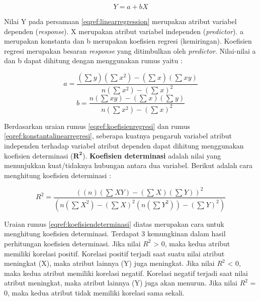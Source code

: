 		\begin{equation}
		 Y = a + bX
		\label{eqref:linearregression}
		\end{equation}


	
Nilai Y pada persamaan \eqref{eqref:linearregression} merupakan atribut variabel dependen (\textit{response}). X merupakan atribut variabel independen (\textit{predictor}). a merupakan konstanta dan b merupakan koefisien regresi (kemiringan). Koefisien regresi merupakan besaran \textit{response} yang ditimbulkan oleh \textit{predictor}. Nilai-nilai a dan b dapat dihitung dengan menggunakan rumus yaitu : 
		
		\begin{equation}
		 a = \frac{(\sum_{}^{} y)(\sum_{}^{} x^2) - (\sum_{}^{} x)(\sum{}^{} xy)}{n(\sum{}^{} x^2)-(\sum{}^{} x)^2}   
		 \label{eqref:konstantalinearregresi}
		\end{equation}
		\begin{equation}
		b = \frac{n(\sum{}^{} xy)-(\sum{}^{} x)(\sum{}^{} y)}{n(\sum{}^{} x^2)-(\sum{}^{} x)^2}
		\label{eqref:koefisienregresi}
		\end{equation}

Berdasarkan uraian rumus \eqref{eqref:koefisienregresi} dan rumus \eqref{eqref:konstantalinearregresi}, seberapa kuatnya pengaruh variabel atribut independen terhadap variabel  atribut dependen dapat dihitung menggunakan koefisien determinasi ($\mathbf{R^2}$). \textbf{Koefisien determinasi} adalah nilai yang menunjukkan kuat/tidaknya hubungan antara dua variabel. Berikut adalah cara menghitung koefisien determinasi : 
		
		\begin{equation}
		R^2 = \frac{((n)(\sum{}^{}XY)-(\sum{}^{}X)(\sum{}^{}Y))^2}{(n(\sum{}^{}X^2)-(\sum{}^{}X)^2(n(\sum{}^{}Y^2))-(\sum{}^{}Y)^2)}
		\label{eqref:koefisiendeterminasi}		
		\end{equation}
		
Uraian rumus \eqref{eqref:koefisiendeterminasi} diatas merupakan cara untuk menghitung koefisien determinasi. Terdapat 3 kemungkinan dalam hasil perhitungan koefisien determinasi. Jika nilai \textit{$R^2$} > 0, maka kedua atribut memiliki korelasi positif. Korelasi positif  terjadi saat suatu nilai atribut meningkat (X), maka atribut lainnya (Y) juga meningkat. Jika nilai \textit{$R^2$} < 0, maka kedua atribut memiliki korelasi negatif. Korelasi negatif terjadi saat  nilai atribut meningkat, maka atribut lainnya (Y) juga akan menurun. Jika nilai \textit{$R^2$} = 0, maka kedua atribut tidak memiliki korelasi sama sekali. 

